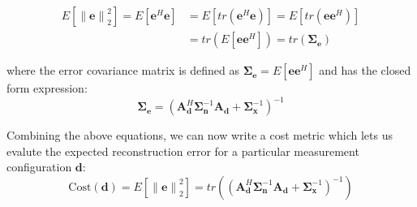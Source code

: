 \documentclass{article}
\providecommand{\norm}[1]{\left\lVert#1\right\rVert}
\begin{document}
\begin{align*}
E[\norm{\bm{e}}_2^2] =  E[\bm{e}^H\bm{e}] & = E[tr(\bm{e}^H\bm{e})] = E[tr(\bm{e}\bm{e}^H)] \\
& = tr(E[\bm{e}\bm{e}^H]) = tr(\bm{\Sigma}_{\bm{e}})
\end{align*}

where the error covariance matrix is defined as $\bm{\Sigma}_{\bm{e}} =
E[\bm{e}\bm{e}^H]$ and has the closed form expression:
\begin{equation}
\bm{\Sigma}_{\bm{e}} = \left( \bm{A}_{\bm{d}}^H\bm{\Sigma}_{\bm{n}}^{-1} \bm{A}_{\bm{d}} +
    \bm{\Sigma}_{\bm{x}}^{-1}\right)^{-1}
\end{equation}

Combining the above equations, we can now write a cost metric which lets us evalute
the expected reconstruction error for a particular measurement configuration $\bm{d}$:
\begin{equation}
\text{Cost}(\bm{d}) = E[\norm{\bm{e}}_2^2] = tr\left(\left( \bm{A}_{\bm{d}}^H\bm{\Sigma}_{\bm{n}}^{-1} \bm{A}_{\bm{d}} +
    \bm{\Sigma}_{\bm{x}}^{-1}\right)^{-1}\right)
\end{equation}


\end{document}
